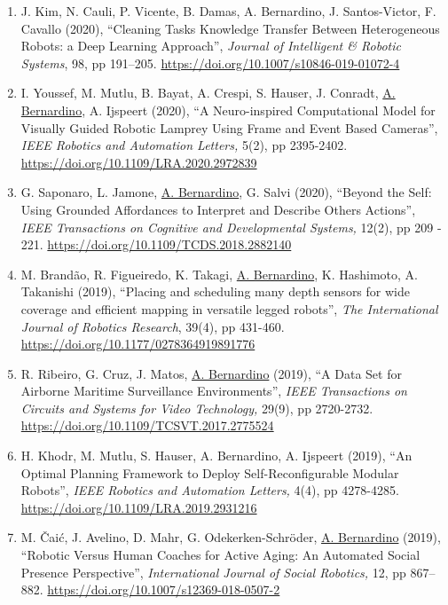 \documentclass[
]{article}
\begin{document}
\begin{enumerate}
  statistics for 3D Model-Based UAV Tracking'', \emph{IEEE Access,} 8,
  pp 33884-33897. \url{https://www.doi.org/10.1109/ACCESS.2020.2973970}~
\item
  J. Kim, N. Cauli, P. Vicente, B. Damas, A. Bernardino, J.
  Santos-Victor, F. Cavallo (2020), ``Cleaning Tasks Knowledge Transfer
  Between Heterogeneous Robots: a Deep Learning Approach'',
  \emph{Journal of Intelligent \& Robotic Systems}, 98, pp 191--205.
  \url{https://doi.org/10.1007/s10846-019-01072-4}
\item
  I. Youssef, M. Mutlu, B. Bayat, A. Crespi, S. Hauser, J. Conradt,
  \ul{A. Bernardino}, A. Ijspeert (2020), ``A Neuro-inspired
  Computational Model for Visually Guided Robotic Lamprey Using Frame
  and Event Based Cameras'', \emph{IEEE Robotics and Automation
  Letters,} 5(2), pp 2395-2402.
  \url{https://doi.org/10.1109/LRA.2020.2972839}
\item
  G. Saponaro, L. Jamone, \ul{A. Bernardino}, G. Salvi (2020), ``Beyond
  the Self: Using Grounded Affordances to Interpret and Describe
  Others\textquotesingle{} Actions'', \emph{IEEE Transactions on
  Cognitive and Developmental Systems,} 12(2), pp 209 - 221.
  \url{https://doi.org/10.1109/TCDS.2018.2882140}~
\item
  M. Brandão, R. Figueiredo, K. Takagi, \ul{A. Bernardino}, K.
  Hashimoto, A. Takanishi (2019), ``Placing and scheduling many depth
  sensors for wide coverage and efficient mapping in versatile legged
  robots'', \emph{The International Journal of Robotics Research},
  39(4), pp 431-460. \url{https://doi.org/10.1177/0278364919891776}~
\item
  R. Ribeiro, G. Cruz, J. Matos, \ul{A. Bernardino} (2019), ``A Data Set
  for Airborne Maritime Surveillance Environments'', \emph{IEEE
  Transactions on Circuits and Systems for Video Technology,} 29(9), pp
  2720-2732. \url{https://doi.org/10.1109/TCSVT.2017.2775524}~~
\item
  H. Khodr, M. Mutlu, S. Hauser, A. Bernardino, A. Ijspeert (2019), ``An
  Optimal Planning Framework to Deploy Self-Reconfigurable Modular
  Robots'', \emph{IEEE Robotics and Automation Letters,} 4(4), pp
  4278-4285. \url{https://doi.org/10.1109/LRA.2019.2931216}~
\item
  M. Čaić, J. Avelino, D. Mahr, G. Odekerken-Schröder, \ul{A.
  Bernardino} (2019), ``Robotic Versus Human Coaches for Active Aging:
  An Automated Social Presence Perspective'', \emph{International
  Journal of Social Robotics,} 12, pp 867--882.
  \url{https://doi.org/10.1007/s12369-018-0507-2}~

\end{enumerate}
\end{document}
